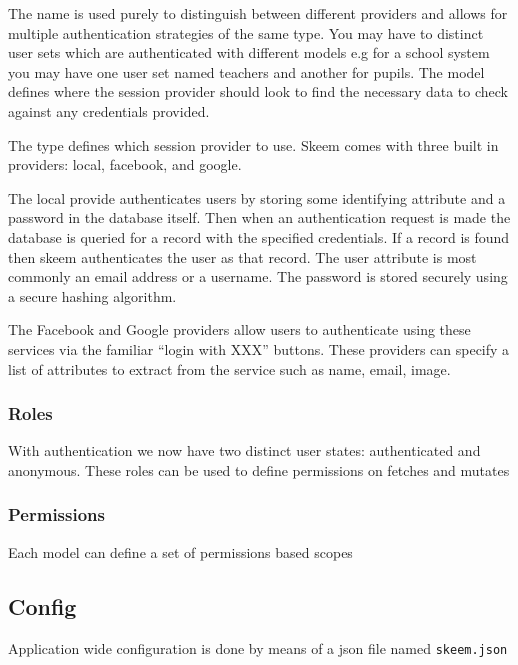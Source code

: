 \documentclass[
  12pt,
]{article}
\newcommand{\passthrough}[1]{#1}
\begin{document}
The name is used purely to distinguish between different providers and
allows for multiple authentication strategies of the same type. You may
have to distinct user sets which are authenticated with different models
e.g for a school system you may have one user set named teachers and
another for pupils. The model defines where the session provider should
look to find the necessary data to check against any credentials
provided.

The type defines which session provider to use. Skeem comes with three
built in providers: local, facebook, and google.

The local provide authenticates users by storing some identifying
attribute and a password in the database itself. Then when an
authentication request is made the database is queried for a record with
the specified credentials. If a record is found then skeem authenticates
the user as that record. The user attribute is most commonly an email
address or a username. The password is stored securely using a secure
hashing algorithm.

The Facebook and Google providers allow users to authenticate using
these services via the familiar ``login with XXX'' buttons. These
providers can specify a list of attributes to extract from the service
such as name, email, image.

\hypertarget{roles}{%
\subsubsection{Roles}\label{roles}}

With authentication we now have two distinct user states: authenticated
and anonymous. These roles can be used to define permissions on fetches
and mutates

\hypertarget{permissions}{%
\subsubsection{Permissions}\label{permissions}}

Each model can define a set of permissions based scopes

\hypertarget{config}{%
\subsection{Config}\label{config}}

Application wide configuration is done by means of a json file named
\passthrough{\lstinline!skeem.json!}
\end{document}
